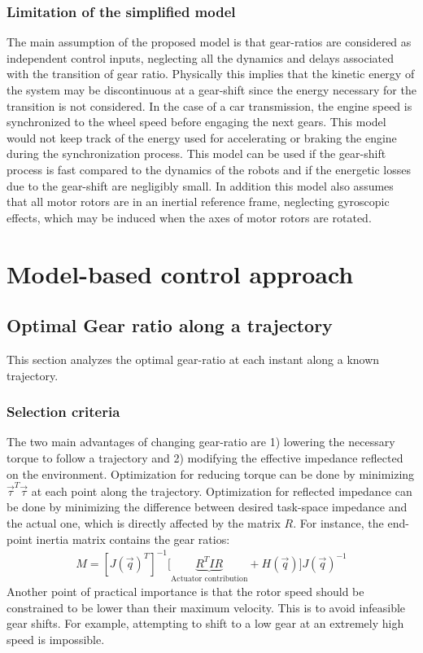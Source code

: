 \subsubsection{Limitation of the simplified model}
\label{sec:limitation}
%
The main assumption of the proposed model is that gear-ratios are considered as independent control inputs, neglecting all the dynamics and delays associated with the transition of gear ratio. Physically this implies that the kinetic energy of the system may be discontinuous at a gear-shift since the energy necessary for the transition is not considered. In the case of a car transmission, the engine speed is synchronized to the wheel speed before engaging the next gears. This model would not keep track of the energy used for accelerating or braking the engine during the synchronization process. This model can be used if the gear-shift process is fast compared to the dynamics of the robots and if the energetic losses due to the gear-shift are negligibly small. In addition this model also assumes that all motor rotors are in an inertial reference frame, neglecting gyroscopic effects, which may be induced when the axes of motor rotors are rotated.


\section{Model-based control approach}
\label{sec:HierachicalControlApproach}


\subsection{Optimal Gear ratio along a trajectory}

This section analyzes the optimal gear-ratio at each instant along a known trajectory. 

\subsubsection{Selection criteria}
\label{sec:GearSelectionCriteria}

The two main advantages of changing gear-ratio are 1) lowering the necessary torque to follow a trajectory and 2) modifying the effective impedance reflected on the environment. Optimization for reducing torque can be done by minimizing $\vec{\tau}^T \vec{\tau}$ at each point along the trajectory. Optimization for reflected impedance can be done by minimizing the difference between desired task-space impedance and the actual one, which is directly affected by the matrix $R$. For instance, the end-point inertia matrix contains the gear ratios: 
%
\begin{align}
	M = [J(\vec{q})^T]^{-1} \big [ \underbrace{ R^T I R }_{\text{Actuator contribution}} + H( \vec{q} ) \big ] J(\vec{q})^{-1}
 \label{eq:endpointmass}
\end{align}
%
Another point of practical importance is that the rotor speed should be constrained to be lower than their maximum velocity. This is to avoid infeasible gear shifts. For example, attempting to shift to a low gear at an extremely high speed is impossible. 

